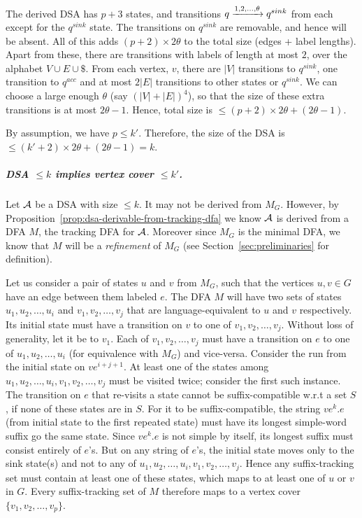   The derived DSA has $p + 3$ states, and transitions $q \xrightarrow{1, 2, \dots,
\theta} q^{sink}$ from each except for the $q^{sink}$ state. The
transitions on $q^{sink}$ are removable, and hence will be absent. All of this adds $(p+2) \times 2 \theta$ to the total size (edges +
label lengths). Apart from these, there are transitions with
labels of length at most $2$, over the alphabet $V \cup E \cup \$$. From each vertex, $v$, there are $|V|$ transitions to $q^{sink}$, one transition to $q^{acc}$ and at most $2|E|$ transitions to other states or $q^{sink}$. We
can choose a large enough $\theta$ (say $(|V| + |E|)^4$), so that the size of
these extra transitions is at most $2 \theta - 1$. 
  Hence, total size is $\le (p + 2) \times 2 \theta + (2 \theta - 1)$.

By assumption, we have $p \le k'$. Therefore, the size of the DSA 
is $\le (k' + 2) \times 2 \theta + (2 \theta - 1)%
=k$.

 

  \subparagraph*{DSA $\le k$ implies vertex cover $\le k'$.}

  Let $\mathcal{A}$ be a DSA with size $\le k$. It may not be derived from $M_G$. However, by Proposition~\ref{prop:dsa-derivable-from-tracking-dfa} we know $\mathcal{A}$ is derived from a DFA $M$, the tracking DFA for $\mathcal{A}$. Moreover since $M_G$ is the minimal DFA, we know that $M$ will be a \emph{refinement} of $M_G$ (see Section~\ref{sec:preliminaries} for definition).


  
  Let us consider a pair of states $u$ and $v$ from $M_G$, such that the vertices $u,v \in G$ have an edge between them labeled $e$. The DFA $M$ will have two sets of states $u_1,u_2,\dots,u_i$ and $v_1,v_2,\dots,v_j$ that are language-equivalent to $u$ and $v$ respectively. Its initial state must have a transition on $v$ to one of $v_1,v_2,\dots,v_j$. Without loss of generality, let it be to $v_1$. Each of $v_1,v_2,\dots,v_j$ must have a transition on $e$ to one of $u_1,u_2,\dots,u_i$ (for equivalence with $M_G$) and vice-versa. Consider the run from the initial state on $ve^{i+j+1}$. At least one of the states among $u_1,u_2,\dots,u_i, v_1,v_2,\dots,v_j$ must be visited twice; consider the first such instance. The transition on $e$ that re-visits a state cannot be suffix-compatible w.r.t a set $S$, if none of these states are in $S$. For it to be suffix-compatible, the string $ve^k.e$ (from initial state to the first repeated state) must have its longest simple-word suffix go the same state. Since $ve^k.e$ is not simple by itself, its longest suffix must consist entirely of $e$'s. But on any string of $e$'s, the initial state moves only to the sink state(s) and not to any of $u_1,u_2,\dots,u_i, v_1,v_2,\dots,v_j$. Hence any suffix-tracking set must contain at least one of these states, which maps to at least one of $u$ or $v$ in $G$. Every suffix-tracking set of $M$ therefore maps to a vertex cover $\{v_1, v_2, \dots, v_p\}$.
  

